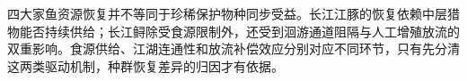 四大家鱼资源恢复并不等同于珍稀保护物种同步受益。长江江豚的恢复依赖中层猎物能否持续供给；长江鲟除受食源限制外，还受到洄游通道阻隔与人工增殖放流的双重影响。食源供给、江湖连通性和放流补偿效应分别对应不同环节，只有先分清这两类驱动机制，种群恢复差异的归因才有依据。
